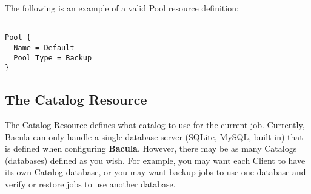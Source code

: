 The following is an example of a valid Pool resource definition: 

\footnotesize
\begin{verbatim}
 
Pool {
  Name = Default
  Pool Type = Backup
}
\end{verbatim}
\normalsize

\subsection*{The Catalog Resource}
\label{CatalogResource}

The Catalog Resource defines what catalog to use for the current job.
Currently, Bacula can only handle a single database server (SQLite, MySQL,
built-in) that is defined when configuring {\bf Bacula}. However, there may be
as many Catalogs (databases) defined as you wish. For example, you may want
each Client to have its own Catalog database, or you may want backup jobs to
use one database and verify or restore jobs to use another database. 


